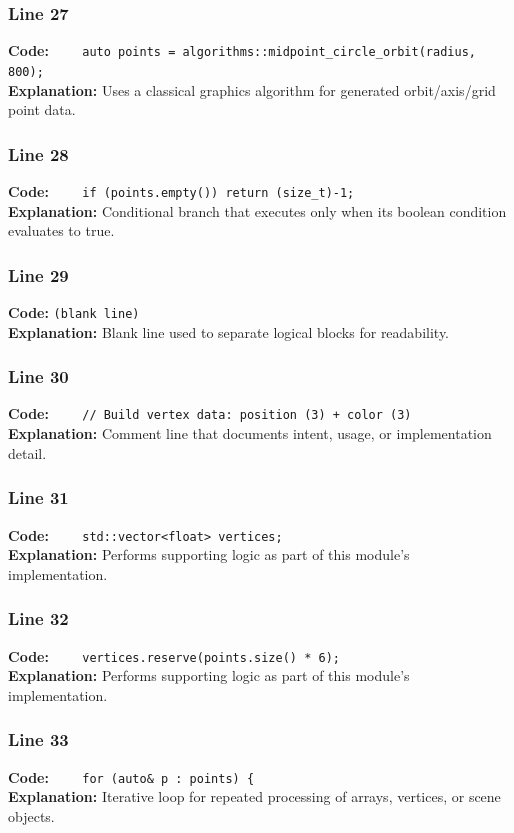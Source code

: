 \documentclass[11pt,a4paper]{article}
\begin{document}
\subsubsection*{Line 27}
\textbf{Code:} \verb|    auto points = algorithms::midpoint_circle_orbit(radius, 800);|\\
\textbf{Explanation:} Uses a classical graphics algorithm for generated orbit/axis/grid point data.

\subsubsection*{Line 28}
\textbf{Code:} \verb|    if (points.empty()) return (size_t)-1;|\\
\textbf{Explanation:} Conditional branch that executes only when its boolean condition evaluates to true.

\subsubsection*{Line 29}
\textbf{Code:} \texttt{(blank line)}\\
\textbf{Explanation:} Blank line used to separate logical blocks for readability.

\subsubsection*{Line 30}
\textbf{Code:} \verb|    // Build vertex data: position (3) + color (3)|\\
\textbf{Explanation:} Comment line that documents intent, usage, or implementation detail.

\subsubsection*{Line 31}
\textbf{Code:} \verb|    std::vector<float> vertices;|\\
\textbf{Explanation:} Performs supporting logic as part of this module's implementation.

\subsubsection*{Line 32}
\textbf{Code:} \verb|    vertices.reserve(points.size() * 6);|\\
\textbf{Explanation:} Performs supporting logic as part of this module's implementation.

\subsubsection*{Line 33}
\textbf{Code:} \verb|    for (auto& p : points) {|\\
\textbf{Explanation:} Iterative loop for repeated processing of arrays, vertices, or scene objects.
\end{document}
